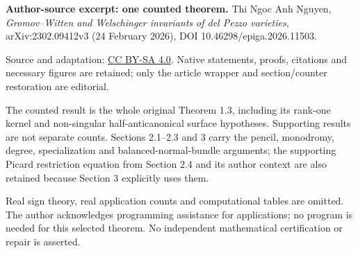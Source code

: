 \noindent\textbf{Author-source excerpt: one counted theorem.} Thi Ngoc Anh Nguyen, \emph{Gromov--Witten and Welschinger invariants of del Pezzo varieties}, arXiv:2302.09412v3 (24 February 2026), DOI 10.46298/epiga.2026.11503.
\par\noindent Source and adaptation: \href{https://creativecommons.org/licenses/by-sa/4.0/}{CC BY-SA 4.0}. Native statements, proofs, citations and necessary figures are retained; only the article wrapper and section/counter restoration are editorial.
\par\noindent The counted result is the whole original Theorem 1.3, including its rank-one kernel and non-singular half-anticanonical surface hypotheses. Supporting results are not separate counts. Sections 2.1--2.3 and 3 carry the pencil, monodromy, degree, specialization and balanced-normal-bundle arguments; the supporting Picard restriction equation from Section 2.4 and its author context are also retained because Section 3 explicitly uses them.
\par\noindent Real sign theory, real application counts and computational tables are omitted. The author acknowledges programming assistance for applications; no program is needed for this selected theorem. No independent mathematical certification or repair is asserted.
